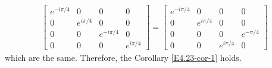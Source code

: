 \documentclass[en]{sol-man}
\begin{document}
\begin{sol}
\begin{pf}
\begin{align}
\begin{bmatrix}
                e^{-i\pi/4}&0&0&0\\
                0&e^{i\pi/4}&0&0\\
                0&0&e^{-i\pi/4}&0\\
                0&0&0&e^{i\pi/4}
            \end{bmatrix}=\begin{bmatrix}
                e^{-i\pi/4}&0&0&0\\
                0&e^{i\pi/4}&0&0\\
                0&0&0&e^{-\pi/4}\\
                0&0&e^{i\pi/4}&0
            \end{bmatrix}
        \end{align}
        which are the same. Therefore, the Corollary \ref{E4.23-cor-1} holds.
    \end{pf}


\end{sol}
\end{document}
